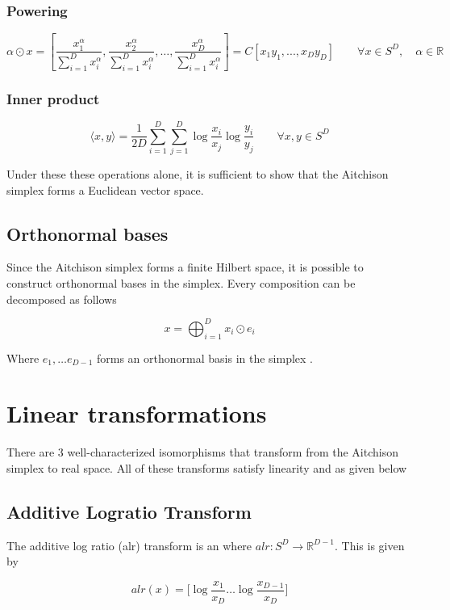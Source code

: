 \subsubsection{Powering}

\[
\alpha \odot x = [\frac{x_1^{\alpha}}{\sum_{i=1}^D x_i^{\alpha}},\frac{x_2^{\alpha}}{\sum_{i=1}^D x_i^{\alpha}}, \dots,\frac{x_D^{\alpha}}{\sum_{i=1}^D x_i^{\alpha}}] =
C[x_1 y_1, ..., x_D y_D]  \qquad \forall x \in S^D, \quad \alpha \in \mathbb{R}
\]

\subsubsection{Inner product}

\[
\langle x, y \rangle = \frac{1}{2D}
\sum\limits_{i=1}^{D}
\sum\limits_{j=1}^{D}
\log \frac{x_i}{x_j}
\log \frac{y_i}{y_j}
\qquad \forall x, y \in S^D
\]

Under these these operations alone, it is sufficient to show that the Aitchison simplex forms a Euclidean vector space.

\subsection{Orthonormal bases}
Since the Aitchison simplex forms a finite Hilbert space, it is possible to construct orthonormal bases in the simplex. Every composition can be decomposed as follows

\[ x = \bigoplus_{i=1}^D x_i \odot e_i \]

Where $e_1, \ldots e_{D-1} $ forms an orthonormal basis in the simplex \cite{ilr}.

\section{Linear transformations}

There are 3 well-characterized isomorphisms that transform from the Aitchison simplex to real space.  All of these transforms satisfy linearity and as given below

\subsection{Additive Logratio Transform}
The additive log ratio (alr) transform is an where $alr: S^D \rightarrow \mathbb{R}^{D-1} $.  This is given by

\[ alr(x) = \big[ \log \frac{x_1}{x_D} \ldots \log \frac{x_{D-1}}{x_D} \big]\]

